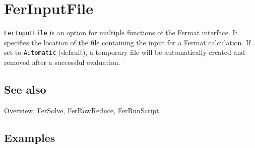 \documentclass[../FeynHelpersManual.tex]{subfiles}
\begin{document}
\hypertarget{ferinputfile}{
\section{FerInputFile}\label{ferinputfile}}

\texttt{FerInputFile} is an option for multiple functions of the Fermat
interface. It specifies the location of the file containing the input
for a Fermat calculation. If set to \texttt{Automatic} (default), a
temporary file will be automatically created and removed after a
successful evaluation.

\subsection{See also}

\hyperlink{toc}{Overview}, \hyperlink{fersolve}{FerSolve},
\hyperlink{ferrowreduce}{FerRowReduce},
\hyperlink{ferrunscript}{FerRunScript}.

\subsection{Examples}
\end{document}
